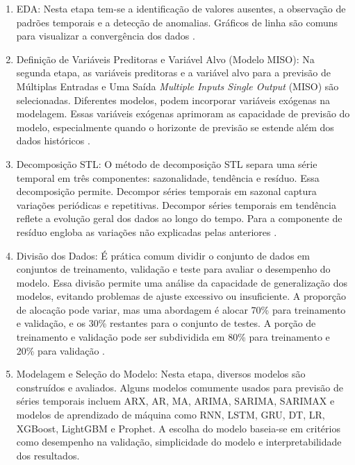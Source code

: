 \begin{enumerate}
	
	\item {EDA}: Nesta etapa  tem-se a identificação de valores ausentes, a observação de padrões temporais e a detecção de anomalias. Gráficos de linha são comuns para visualizar a convergência dos dados \cite{Rostam2021108249}.
	
	\item {Definição de Variáveis Preditoras e Variável Alvo (Modelo MISO)}: Na segunda etapa, as variáveis preditoras e a variável alvo para a previsão de Múltiplas Entradas e Uma Saída \textit{Multiple Inputs Single Output} (MISO) são selecionadas. Diferentes modelos, podem incorporar variáveis exógenas na modelagem. Essas variáveis exógenas aprimoram as capacidade de previsão do modelo, especialmente quando o horizonte de previsão se estende além dos dados históricos \cite{PAWLOWSKI202298}. 
	
	\item {Decomposição STL}: O método de decomposição STL separa uma série temporal em três componentes: sazonalidade, tendência e resíduo. Essa decomposição permite. Decompor séries temporais em sazonal captura variações periódicas e repetitivas. Decompor séries temporais em tendência reflete a evolução geral dos dados ao longo do tempo. Para a componente de resíduo engloba as variações não explicadas pelas anteriores \cite{Bandara2021}.
	
	\item {Divisão dos Dados}: É prática comum dividir o conjunto de dados em conjuntos de treinamento, validação e teste para avaliar o desempenho do modelo. Essa divisão permite uma análise da capacidade de generalização dos modelos, evitando problemas de ajuste excessivo ou insuficiente. A proporção de alocação pode variar, mas uma abordagem é alocar 70\% para treinamento e validação, e os 30\% restantes para o conjunto de testes. A porção de treinamento e validação pode ser subdividida em 80\% para treinamento e 20\% para validação \cite{Tao2020}.
	
	\item {Modelagem e Seleção do Modelo}: Nesta etapa, diversos modelos são construídos e avaliados. Alguns modelos comumente usados para previsão de séries temporais incluem ARX, AR, MA, ARIMA, SARIMA, SARIMAX  e modelos de aprendizado de máquina como RNN, LSTM, GRU, DT, LR, XGBoost, LightGBM e Prophet. A escolha do modelo baseia-se em critérios como desempenho na validação, simplicidade do modelo e interpretabilidade dos resultados.
	

\end{enumerate}
